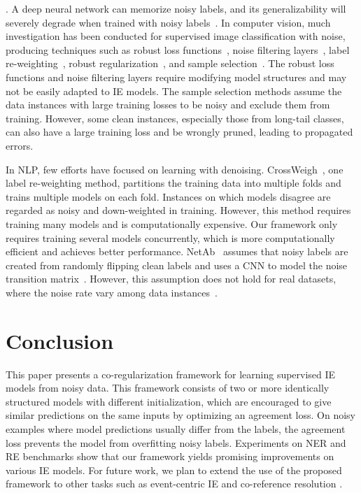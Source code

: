\documentclass[11pt]{article}
\newcommand{\stitle}[1]{\vspace{0.3em}\noindent{\bf #1}}
\begin{document}
\stitle{Supervised learning with noisy labels}.
A deep neural network can memorize noisy labels, and its generalizability will severely degrade when trained with noisy labels~\cite{Zhang2017UnderstandingDL}.
In computer vision, much investigation has been conducted for supervised image classification with noise,
producing techniques such as robust loss functions~\cite{Zhang2018GeneralizedCE,Wang2019SymmetricCE}, noise filtering layers~\cite{Sukhbaatar2014TrainingCN,Goldberger2017TrainingDN}, label re-weighting~\cite{wang2017multiclass,Chang2017ActiveBT}, robust regularization~\cite{krogh1992simple,srivastava2014dropout,muller2019does}, and sample selection~\cite{Malach2017DecouplingT,Jiang2018MentorNetLD,Han2018CoteachingRT,Yu2019HowDD,Wei2020CombatingNL}.
The robust loss functions and noise filtering layers require modifying model structures and may not be easily adapted to IE models.
The sample selection methods assume the data instances with large training losses to be noisy and exclude them from training.
However, some clean instances, especially those from long-tail classes, can also have a large training loss and be wrongly pruned, leading to propagated errors.


In NLP, few efforts have focused on learning with denoising.
CrossWeigh~\cite{Wang2019CrossWeighTN}, one label re-weighting method, partitions the training data into multiple folds and trains multiple models on each fold.
Instances on which models disagree are regarded as noisy and down-weighted in training.
However, this method requires training many models and is computationally expensive.
Our framework only requires training several models concurrently, which is more computationally efficient and achieves better performance.
NetAb~\cite{Wang2019LearningWN} assumes that noisy labels are created from randomly flipping clean labels and uses a CNN to model the noise transition matrix~\cite{Wang2018MulticlassLW}.
However, this assumption does not hold for real datasets, where the noise rate vary among data instances~\cite{Cheng2017LearningWB}.

\section{Conclusion}
This paper presents a co-regularization framework for learning supervised IE models from noisy data.
This framework consists of two or more identically structured models with different initialization, which are encouraged to give similar predictions on the same inputs by optimizing an agreement loss.
On noisy examples where model predictions usually differ from the labels, the agreement loss prevents the model from overfitting noisy labels.
Experiments on NER and RE benchmarks show that our framework yields promising improvements on various IE models.
For future work, we plan to extend the use of the proposed framework to other tasks such as event-centric IE \cite{chen2021event} and co-reference resolution \cite{peng2015solving}.
\end{document}
